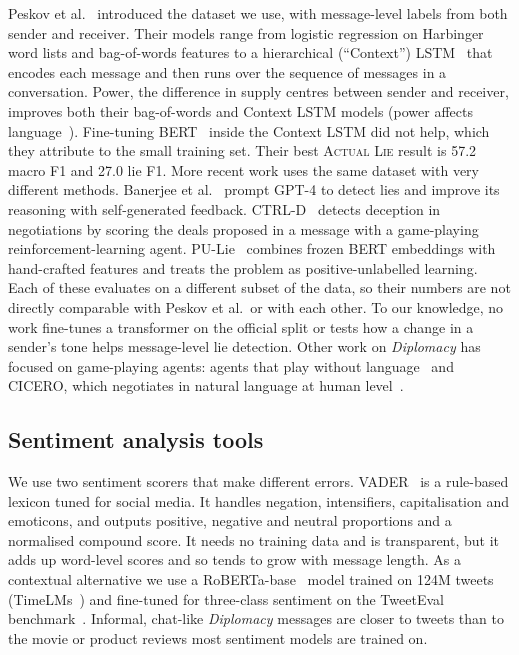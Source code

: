\documentclass[conference]{IEEEtran}
\begin{document}
Peskov et al.~\cite{peskov2020takes} introduced the dataset we use, with message-level labels from both sender and receiver. Their models range from logistic regression on Harbinger word lists and bag-of-words features to a hierarchical (``Context'') LSTM~\cite{hochreiter1997lstm} that encodes each message and then runs over the sequence of messages in a conversation. Power, the difference in supply centres between sender and receiver, improves both their bag-of-words and Context LSTM models (power affects language~\cite{danescu2012echoes}). Fine-tuning BERT~\cite{devlin2019bert} inside the Context LSTM did not help, which they attribute to the small training set. Their best \textsc{Actual Lie} result is 57.2 macro F1 and 27.0 lie F1. More recent work uses the same dataset with very different methods. Banerjee et al.~\cite{banerjee2024llms} prompt GPT-4 to detect lies and improve its reasoning with self-generated feedback. CTRL-D~\cite{wongkamjan2025ctrld} detects deception in negotiations by scoring the deals proposed in a message with a game-playing reinforcement-learning agent. PU-Lie~\cite{kuwar2025pulie} combines frozen BERT embeddings with hand-crafted features and treats the problem as positive-unlabelled learning. Each of these evaluates on a different subset of the data, so their numbers are not directly comparable with Peskov et al.\ or with each other. To our knowledge, no work fine-tunes a transformer on the official split or tests how a change in a sender's tone helps message-level lie detection. Other work on \textit{Diplomacy} has focused on game-playing agents: agents that play without language~\cite{paquette2019nopress} and CICERO, which negotiates in natural language at human level~\cite{meta2022cicero}.

\subsection{Sentiment analysis tools}
We use two sentiment scorers that make different errors. VADER~\cite{hutto2014vader} is a rule-based lexicon tuned for social media. It handles negation, intensifiers, capitalisation and emoticons, and outputs positive, negative and neutral proportions and a normalised compound score. It needs no training data and is transparent, but it adds up word-level scores and so tends to grow with message length. As a contextual alternative we use a RoBERTa-base~\cite{liu2019roberta} model trained on 124M tweets (TimeLMs~\cite{loureiro2022timelms}) and fine-tuned for three-class sentiment on the TweetEval benchmark~\cite{barbieri2020tweeteval}. Informal, chat-like \textit{Diplomacy} messages are closer to tweets than to the movie or product reviews most sentiment models are trained on.
\end{document}
